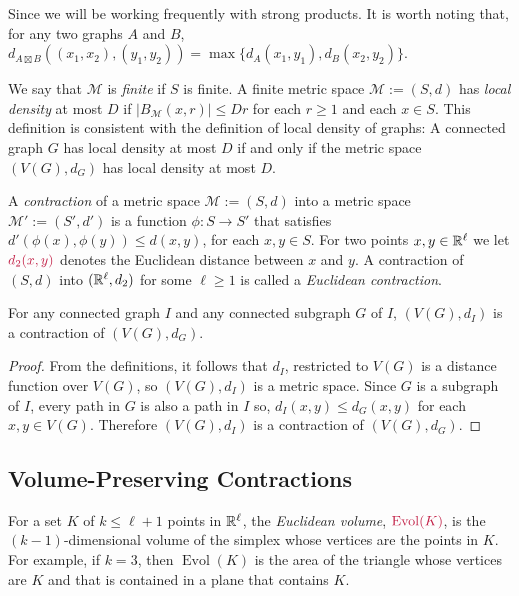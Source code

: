 \documentclass{patmorin}
\makeatletter
\newcommand{\defin}[1]{\emph{\textcolor{brightmaroon}{#1}}}
\def\mathcolor#1#{\@mathcolor{#1}}
\def\@mathcolor#1#2#3{%
  \protect\leavevmode
  \begingroup
    \color#1{#2}#3%
  \endgroup
}
\newcommand{\mathdefin}[1]{\mathcolor{brightmaroon}{#1}}
\DeclareMathOperator{\evol}{Evol}
\makeatother
\begin{document}

Since we will be working frequently with strong products. It is worth noting that, for any two graphs $A$ and $B$, $d_{A\boxtimes B}((x_1,x_2),(y_1,y_2))=\max\{d_A(x_1,y_1),d_B(x_2,y_2)\}$.

We say that $\mathcal{M}$ is \defin{finite} if $S$ is finite.  A finite metric space $\mathcal{M}:=(S,d)$ has \defin{local density} at most $D$ if $|B_\mathcal{M}(x,r)|\le Dr$ for each $r\ge 1$ and each $x\in S$.  This definition is consistent with the definition of local density of graphs:  A connected graph $G$ has local density at most $D$ if and only if the metric space $(V(G),d_G)$ has local density at most $D$.

A \defin{contraction} of a metric space $\mathcal{M}:=(S,d)$ into a metric space $\mathcal{M'}:=(S',d')$ is a function $\phi:S\to S'$ that satisfies $d'(\phi(x),\phi(y))\le d(x,y)$, for each $x,y\in S$.  For two points $x,y\in\mathbb{R}^\ell$ we let $\mathdefin{d_2(x,y)}$ denotes the Euclidean distance between $x$ and $y$.  A contraction of $(S,d)$ into $(\mathbb{R}^\ell, d_2)$ for some $\ell\ge 1$ is called a \defin{Euclidean contraction}.

\begin{obs}\label{supergraph_contraction}
  For any connected graph $I$ and any connected subgraph $G$ of $I$, $(V(G),d_I)$ is a contraction of $(V(G),d_G)$.
\end{obs}

\begin{proof}
  From the definitions, it follows that $d_I$, restricted to $V(G)$ is a distance function over $V(G)$, so $(V(G),d_I)$ is a metric space.  Since $G$ is a subgraph of $I$, every path in $G$ is also a path in $I$ so, $d_I(x,y)\le d_G(x,y)$ for each $x,y\in V(G)$.  Therefore $(V(G),d_I)$ is a contraction of $(V(G),d_G)$.
\end{proof}


\subsection{Volume-Preserving Contractions}

For a set $K$ of $k\le \ell+1$ points in $\mathbb{R}^\ell$, the \defin{Euclidean volume}, $\mathdefin{\evol(K)}$, is the $(k-1)$-dimensional volume of the simplex whose vertices are the points in $K$.  For example, if $k=3$, then $\evol(K)$ is the area of the triangle whose vertices are $K$ and that is contained in a plane that contains $K$.
\end{document}
